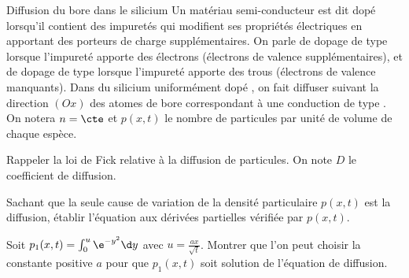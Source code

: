 \begin{exo}[PC][1][TD]{Diffusion du bore dans le silicium}
  Un matériau semi-conducteur est dit dopé lorsqu'il contient des impuretés qui modifient ses propriétés électriques en apportant des porteurs de charge supplémentaires.  On parle de dopage de type  lorsque l'impureté apporte des électrons (électrons de valence supplémentaires), et de dopage de type  lorsque l'impureté apporte des trous (électrons de valence manquants).
Dans du silicium uniformément dopé , on fait diffuser suivant la direction $(Ox)$ des atomes de bore correspondant à une conduction de type . On notera $n=\cte$ et $p(x,t)$ le nombre de particules par unité de volume de chaque espèce.

\begin{quest}
\item Rappeler la loi de Fick relative à la diffusion de particules. On note $D$ le coefficient de diffusion.
\item Sachant que la seule cause de variation de la densité particulaire $p(x,t)$ est la diffusion, établir l'équation aux dérivées partielles vérifiée par $p(x,t)$.
\item Soit $p_1(x,t)=\int_{0}^{u}\e^{-y^2}\d y$ avec $u=\frac{ax}{\sqrt{t}}$. Montrer que l'on peut choisir la constante positive $a$ pour que $p_1(x,t)$ soit solution de l'équation de diffusion.
\end{quest}
\end{exo}
